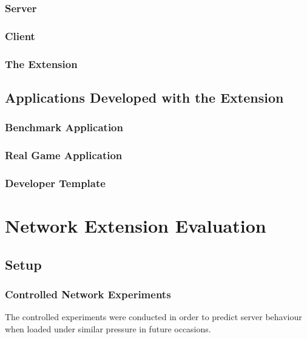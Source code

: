 \documentclass[bsc,frontabs,twoside,singlespacing,parskip,deptreport]{infthesis}     %
\begin{document}
\subsection{Server}
\subsection{Client}
\subsection{The Extension}
\section{Applications Developed with the Extension}
\subsection{Benchmark Application}
\subsection{Real Game Application}
\subsection{Developer Template}







\chapter{Network Extension Evaluation}
\section{Setup}

\subsection{Controlled Network Experiments}
The controlled experiments were conducted in order to predict server behaviour when loaded under similar pressure in future occasions. 
\end{document}
